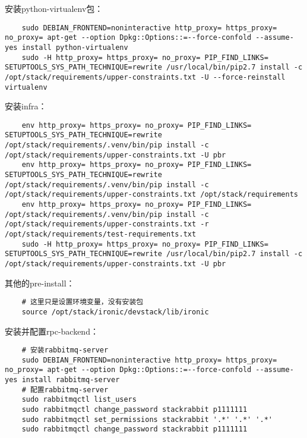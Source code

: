 \documentclass[a4paper,left=1.5cm,right=1.5cm,11pt]{article}
\begin{document}
	安装python-virtualenv包：
	\begin{lstlisting}
	sudo DEBIAN_FRONTEND=noninteractive http_proxy= https_proxy= no_proxy= apt-get --option Dpkg::Options::=--force-confold --assume-yes install python-virtualenv
	sudo -H http_proxy= https_proxy= no_proxy= PIP_FIND_LINKS= SETUPTOOLS_SYS_PATH_TECHNIQUE=rewrite /usr/local/bin/pip2.7 install -c /opt/stack/requirements/upper-constraints.txt -U --force-reinstall virtualenv
	\end{lstlisting}

	安装infra：
	\begin{lstlisting}
	env http_proxy= https_proxy= no_proxy= PIP_FIND_LINKS= SETUPTOOLS_SYS_PATH_TECHNIQUE=rewrite /opt/stack/requirements/.venv/bin/pip install -c /opt/stack/requirements/upper-constraints.txt -U pbr
	env http_proxy= https_proxy= no_proxy= PIP_FIND_LINKS= SETUPTOOLS_SYS_PATH_TECHNIQUE=rewrite /opt/stack/requirements/.venv/bin/pip install -c /opt/stack/requirements/upper-constraints.txt /opt/stack/requirements
	env http_proxy= https_proxy= no_proxy= PIP_FIND_LINKS= /opt/stack/requirements/.venv/bin/pip install -c /opt/stack/requirements/upper-constraints.txt -r /opt/stack/requirements/test-requirements.txt
	sudo -H http_proxy= https_proxy= no_proxy= PIP_FIND_LINKS= SETUPTOOLS_SYS_PATH_TECHNIQUE=rewrite /usr/local/bin/pip2.7 install -c /opt/stack/requirements/upper-constraints.txt -U pbr
	\end{lstlisting}

	其他的pre-install：
	\begin{lstlisting}
	# 这里只是设置环境变量，没有安装包
	source /opt/stack/ironic/devstack/lib/ironic
	\end{lstlisting}

	安装并配置rpc-backend：
	\begin{lstlisting}
	# 安装rabbitmq-server
	sudo DEBIAN_FRONTEND=noninteractive http_proxy= https_proxy= no_proxy= apt-get --option Dpkg::Options::=--force-confold --assume-yes install rabbitmq-server
	# 配置rabbitmq-server
	sudo rabbitmqctl list_users
	sudo rabbitmqctl change_password stackrabbit p1111111
	sudo rabbitmqctl set_permissions stackrabbit '.*' '.*' '.*'
	sudo rabbitmqctl change_password stackrabbit p1111111
	\end{lstlisting}
\end{document}

